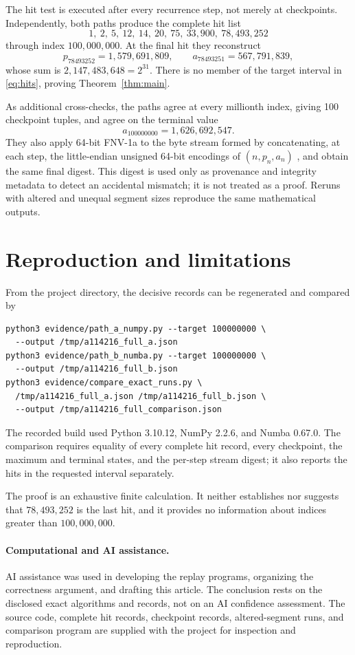 \documentclass[11pt]{article}
\begin{document}
The hit test is executed after every recurrence step, not merely at
checkpoints.  Independently, both paths produce the complete hit list
\begin{equation}\label{eq:hits}
 1,\ 2,\ 5,\ 12,\ 14,\ 20,\ 75,\ 33{,}900,\ 78{,}493{,}252
\end{equation}
through index $100{,}000{,}000$.  At the final hit they reconstruct
\[
 p_{78493252}=1{,}579{,}691{,}809,\qquad
 a_{78493251}=567{,}791{,}839,
\]
whose sum is $2{,}147{,}483{,}648=2^{31}$.  There is no member of the target
interval in \eqref{eq:hits}, proving Theorem~\ref{thm:main}.

As additional cross-checks, the paths agree at every millionth index, giving
100 checkpoint tuples, and agree on the terminal value
\[
 a_{100000000}=1{,}626{,}692{,}547.
\]
They also apply 64-bit FNV-1a to the byte stream formed by concatenating, at
each step, the little-endian unsigned 64-bit encodings of $(n,p_n,a_n)$
\cite{nollEtAl2026FNV}, and obtain the same final digest.  This digest is used
only as provenance and integrity metadata to detect an accidental mismatch;
it is not treated as a proof.  Reruns with altered and unequal segment sizes
reproduce the same mathematical outputs.

\section{Reproduction and limitations}

From the project directory, the decisive records can be regenerated and
compared by
\begin{verbatim}
python3 evidence/path_a_numpy.py --target 100000000 \
  --output /tmp/a114216_full_a.json
python3 evidence/path_b_numba.py --target 100000000 \
  --output /tmp/a114216_full_b.json
python3 evidence/compare_exact_runs.py \
  /tmp/a114216_full_a.json /tmp/a114216_full_b.json \
  --output /tmp/a114216_full_comparison.json
\end{verbatim}
The recorded build used Python 3.10.12, NumPy 2.2.6, and Numba 0.67.0.  The
comparison requires equality of every complete hit record, every checkpoint,
the maximum and terminal states, and the per-step stream digest; it also
reports the hits in the requested interval separately.

The proof is an exhaustive finite calculation.  It neither establishes nor
suggests that $78{,}493{,}252$ is the last hit, and it provides no information
about indices greater than $100{,}000{,}000$.

\paragraph{Computational and AI assistance.}
AI assistance was used in developing the replay programs, organizing the
correctness argument, and drafting this article.  The conclusion rests on the
disclosed exact algorithms and records, not on an AI confidence assessment.
The source code, complete hit records, checkpoint records, altered-segment
runs, and comparison program are supplied with the project for inspection and
reproduction.

\footnotesize

\end{document}
